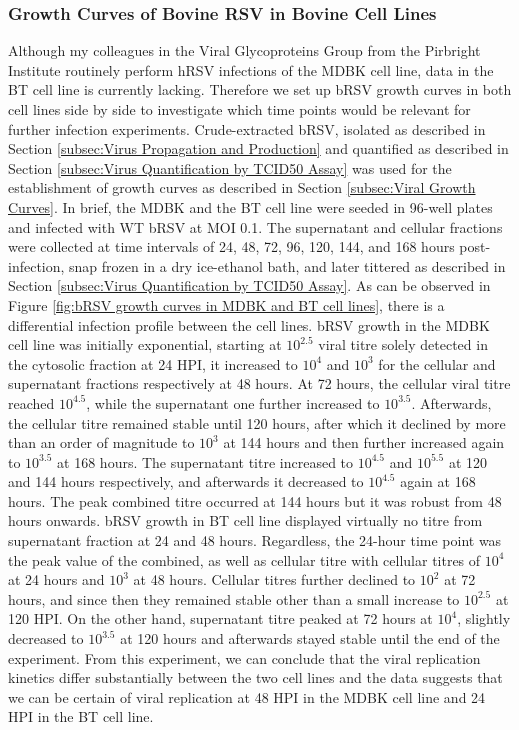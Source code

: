 \subsubsection{Growth Curves of Bovine RSV in Bovine Cell Lines} \label{Growth Curves of Bovine RSV in Bovine Cell Lines}
Although my colleagues in the Viral Glycoproteins Group from the Pirbright Institute routinely perform hRSV infections of the MDBK cell line, data in the BT cell line is currently lacking. Therefore we set up bRSV growth curves in both cell lines side by side to investigate which time points would be relevant for further infection experiments. Crude-extracted bRSV, isolated as described in Section \ref{subsec:Virus Propagation and Production} and quantified as described in Section \ref{subsec:Virus Quantification by TCID50 Assay} was used for the establishment of growth curves as described in Section \ref{subsec:Viral Growth Curves}. In brief, the MDBK and the BT cell line were seeded in 96-well plates and infected with WT bRSV at MOI 0.1. The supernatant and cellular fractions were collected at time intervals of 24, 48, 72, 96, 120, 144, and 168 hours post-infection, snap frozen in a dry ice-ethanol bath, and later tittered as described in Section \ref{subsec:Virus Quantification by TCID50 Assay}. As can be observed in Figure \ref{fig:bRSV growth curves in MDBK and BT cell lines}, there is a differential infection profile between the cell lines. bRSV growth in the MDBK cell line was initially exponential, starting at \(10^{2.5}\) viral titre solely detected in the cytosolic fraction at 24 HPI, it increased to \(10^{4}\) and \(10^{3}\) for the cellular and supernatant fractions respectively at 48 hours. At 72 hours, the cellular viral titre reached \(10^{4.5}\), while the supernatant one further increased to \(10^{3.5}\). Afterwards, the cellular titre remained stable until 120 hours, after which it declined by more than an order of magnitude to \(10^{3}\) at 144 hours and then further increased again to \(10^{3.5}\) at 168 hours. The supernatant titre increased to \(10^{4.5}\) and \(10^{5.5}\) at 120 and 144 hours respectively, and afterwards it decreased to \(10^{4.5}\) again at 168 hours. The peak combined titre occurred at 144 hours but it was robust from 48 hours onwards. bRSV growth in BT cell line displayed virtually no titre from supernatant fraction at 24 and 48 hours. Regardless, the 24-hour time point was the peak value of the combined, as well as cellular titre with cellular titres of \(10^{4}\) at 24 hours and \(10^{3}\) at 48 hours. Cellular titres further declined to \(10^{2}\) at 72 hours, and since then they remained stable other than a small increase to \(10^{2.5}\) at 120 HPI. On the other hand, supernatant titre peaked at 72 hours at \(10^{4}\), slightly decreased to \(10^{3.5}\) at 120 hours and afterwards stayed stable until the end of the experiment. From this experiment, we can conclude that the viral replication kinetics differ substantially between the two cell lines and the data suggests that we can be certain of viral replication at 48 HPI in the MDBK cell line and 24 HPI in the BT cell line.

